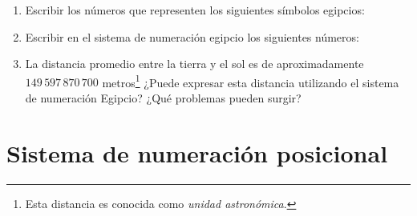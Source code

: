 \documentclass[12pt]{article}
\begin{document}
\begin{enumerate}

    \item Escribir los números que representen los siguientes símbolos
        egipcios:


    \item Escribir en el sistema de numeración egipcio los siguientes números:


    \item La distancia promedio entre la tierra y el sol es de aproximadamente
        $149\,597\,870\,700$ metros\footnote{Esta distancia es conocida como
        \emph{unidad astronómica}.} ¿Puede expresar esta distancia utilizando
        el sistema de numeración Egipcio? ¿Qué problemas pueden surgir?

\end{enumerate}

\section{Sistema de numeración posicional}
\end{document}
